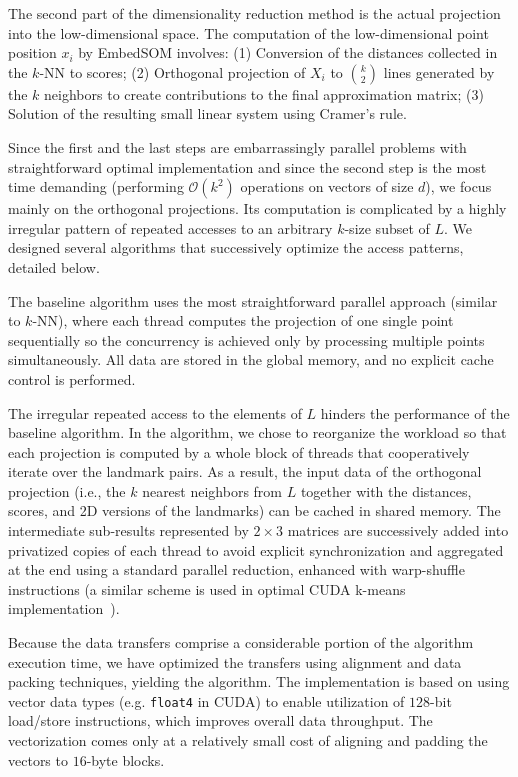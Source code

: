 The second part of the dimensionality reduction method is the actual projection into the low-dimensional space.
The computation of the low-dimensional point position $x_i$ by EmbedSOM involves: 
(1) Conversion of the distances collected in the $k$-NN to scores;
(2) Orthogonal projection of $X_i$ to $k \choose 2$ lines generated by the $k$ neighbors to create contributions to the final approximation matrix;
(3) Solution of the resulting small linear system using Cramer's rule.

Since the first and the last steps are embarrassingly parallel problems with straightforward optimal implementation and since the second step is the most time demanding (performing $\mathcal{O}(k^2)$ operations on vectors of size $d$), we focus mainly on the orthogonal projections. Its computation is complicated by a highly irregular pattern of repeated accesses to an arbitrary $k$-size subset of $L$. We designed several algorithms that successively optimize the access patterns, detailed below.

The baseline algorithm  uses the most straightforward parallel approach (similar to  $k$-NN), where each thread computes the projection of one single point sequentially so the concurrency is achieved only by processing multiple points simultaneously.
All data are stored in the global memory, and no explicit cache control is performed.

The irregular repeated access to the elements of $L$ hinders the performance of the baseline algorithm.
In the  algorithm, we chose to reorganize the workload so that each projection is computed by a whole block of threads that cooperatively iterate over the landmark pairs.
As a result, the input data of the orthogonal projection (i.e., the $k$ nearest neighbors from $L$ together with the distances, scores, and 2D versions of the landmarks) can be cached in shared memory.
The intermediate sub-results represented by $2\times3$ matrices are successively added into privatized copies of each thread to avoid explicit synchronization and aggregated at the end using a standard parallel reduction, enhanced with warp-shuffle instructions (a similar scheme is used in optimal CUDA k-means implementation~\cite{krulis2020detailed}).

Because the data transfers comprise a considerable portion of the  algorithm execution time, we have optimized the transfers using alignment and data packing techniques, yielding the  algorithm.
The implementation is based on using vector data types (e.g. \texttt{float4} in CUDA) to enable utilization of $128$-bit load/store instructions, which improves overall data throughput.
The vectorization comes only at a relatively small cost of aligning and padding the vectors to $16$-byte blocks.

